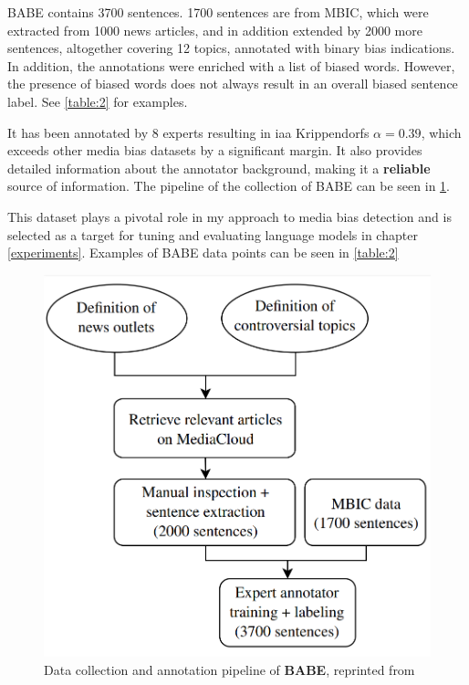 BABE contains 3700 sentences. 1700 sentences are from MBIC, which were extracted from 1000 news articles, and in addition extended by 2000 more sentences, altogether covering 12 topics, annotated with binary bias indications. In addition, the annotations were enriched with a list of biased words. However, the presence of biased words does not always result in an overall biased sentence label. See \ref{table:2} for examples.

It has been annotated by 8 experts resulting in \gls{iaa} Krippendorfs $\alpha = 0.39$, which exceeds other media bias datasets by a significant margin. It also provides detailed information about the annotator background, making it a \textbf{reliable} source of information. The pipeline of the collection of BABE can be seen in \ref{fig:babe-data}.

This dataset plays a pivotal role in my approach to media bias detection and is selected as a target for tuning and evaluating language models in chapter \ref{experiments}. Examples of BABE data points can be seen in 
\ref{table:2}




\begin{figure}
  \includegraphics[scale=0.3]{my_modules/multimedia/babe_workflow.png}
  \caption{Data collection and annotation pipeline of \textbf{BABE}, reprinted from \cite{Spinde2021f}}
  \label{fig:babe-data}
\end{figure}



